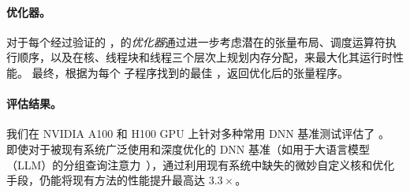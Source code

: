 \paragraph{\graph 优化器。}对于每个经过验证的 \graph，\sys 的{\em \graph 优化器}通过进一步考虑潜在的张量布局、调度运算符执行顺序，以及在核、线程块和线程三个层次上规划内存分配，来最大化其运行时性能。
最终，\sys 根据为每个 \lax 子程序找到的最佳 \graph，返回优化后的张量程序。

\paragraph{评估结果。}
我们在 NVIDIA A100 和 H100 GPU 上针对多种常用 DNN 基准测试评估了 \sys。
即使对于被现有系统广泛使用和深度优化的 DNN 基准（如用于大语言模型（LLM）的分组查询注意力~\cite{grattafiori2024llama3herdmodels}），\sys 通过利用现有系统中缺失的微妙自定义核和优化手段，仍能将现有方法的性能提升最高达 $3.3\times$。
